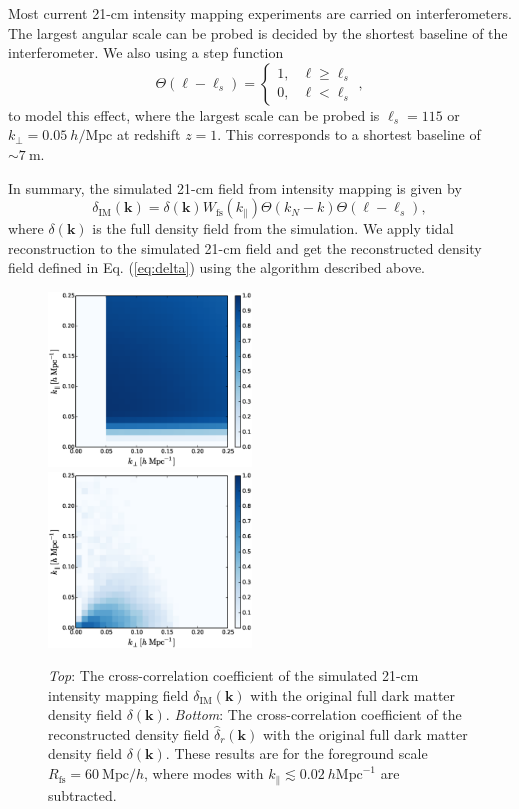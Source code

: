 \documentclass[prd,superscriptaddress,floatfix,notitlepage,nofootinbib,reprint]{revtex4-1}
\newcommand{\mr}{\mathrm}
\newcommand{\kpa}{k_\parallel}
\newcommand{\kpe}{k_\perp}
\newcommand{\bmk}{\bm{k}}
\newcommand{\bea}{\begin{equation}}
\newcommand{\eea}{\end{equation}}
\begin{document}
Most current 21-cm intensity mapping experiments are carried on interferometers.
The largest angular scale can be probed is decided by the shortest baseline of
the interferometer. 
We also using a step function
\begin{displaymath}
    \Theta(\ell-\ell_s)=\left\{
    \begin{array}{ll}
        1,& \ell\geq\ell_s  \\
        0,& \ell<\ell_s 
    \end{array}\right.,
\end{displaymath}
to model this effect, where the largest scale can be probed is $\ell_s=115$
or $\kpe=0.05\ h/\mr{Mpc}$ at redshift $z=1$.
This corresponds to a shortest baseline of $\sim7\ \mr{m}$.

In summary, the simulated 21-cm field from intensity mapping is given by 
\bea    
\delta_{\mr{IM}}(\bmk)=\delta(\bmk)W_{\mr{fs}}(\kpa)\Theta(k_N-k)\Theta(\ell-\ell_s),
\eea
where $\delta(\bmk)$ is the full density field from the simulation.
We apply tidal reconstruction to the simulated 21-cm field and get the 
reconstructed density field defined in Eq. (\ref{eq:delta}) using the algorithm
described above.

\begin{figure}[tbp]
\begin{center}
\includegraphics[width=0.48\textwidth]{./figs/IM.eps}\\
\includegraphics[width=0.48\textwidth]{./figs/kap.eps}
\end{center}
\vspace{-0.7cm}
\caption{{\it Top}: The cross-correlation coefficient of the simulated 21-cm 
    intensity mapping field $\delta_\mr{IM}(\bmk)$ with the original full dark 
    matter density field $\delta(\bmk)$.
    {\it Bottom}: The cross-correlation coefficient of the reconstructed 
    density field $\hat{\delta}_r(\bmk)$ with the original full dark matter 
    density field $\delta(\bmk)$. 
    These results are for the foreground scale $R_\mr{fs}=60\ \mr{Mpc}/h$, 
    where modes with $\kpa\lesssim0.02\ h\mr{Mpc}^{-1}$ are subtracted.}
\label{fig:IM}
\end{figure}
\end{document}
